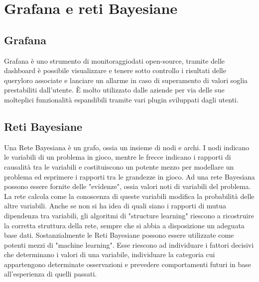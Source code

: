 \section{Grafana e reti Bayesiane}
		\subsection{Grafana}			
Grafana è uno strumento di monitoraggio\pedice dati open-source, tramite delle dashboard è possibile visualizzare e tenere sotto controllo i risultati delle query\pedice loro associate e lanciare un allarme in caso di superamento di valori soglia prestabiliti dall'utente. \`E molto utilizzato dalle aziende per via delle sue molteplici funzionalità  espandibili tramite vari plugin sviluppati dagli utenti.


		\subsection{Reti Bayesiane}
Una Rete Bayesiana è un grafo, ossia un insieme di nodi e archi. I nodi
indicano le variabili di un problema in gioco, mentre le frecce indicano i
rapporti di causalità tra le variabili e costituiscono un potente mezzo per
modellare un problema ed esprimere i rapporti tra le grandezze in gioco.
Ad una rete Bayesiana possono essere fornite delle "evidenze", ossia valori noti di variabili del problema. 
La rete calcola come la conoscenza di queste variabili modifica la probabilità  delle altre variabili.
Anche se non si ha idea di quali siano i rapporti di mutua dipendenza tra
variabili, gli algoritmi di "structure learning" riescono a ricostruire la corretta struttura della rete, sempre che si abbia a disposizione un adeguata base dati.
Sostanzialmente le Reti Bayesiane possono essere utilizzate come potenti mezzi
di "machine learning\pedice". Esse riescono ad individuare i fattori decisivi che
determinano i valori di una variabile, individuare la categoria cui appartengono determinate osservazioni e prevedere comportamenti futuri in base all'esperienza di quelli passati.